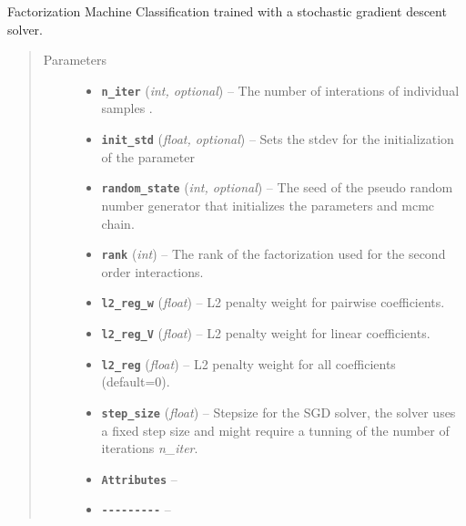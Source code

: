 \documentclass[letterpaper,10pt,english]{sphinxmanual}
\begin{document}
\begin{fulllineitems}
\label{api:fastFM.sgd.FMClassification}
Factorization Machine Classification trained with a stochastic gradient
descent solver.
\begin{quote}\begin{description}
\item[{Parameters}] \leavevmode\begin{itemize}
\item {} 
\textbf{\texttt{n\_iter}} (\emph{int, optional}) -- The number of interations of individual samples .

\item {} 
\textbf{\texttt{init\_std}} (\emph{float, optional}) -- Sets the stdev for the initialization of the parameter

\item {} 
\textbf{\texttt{random\_state}} (\emph{int, optional}) -- The seed of the pseudo random number generator that
initializes the parameters and mcmc chain.

\item {} 
\textbf{\texttt{rank}} (\emph{int}) -- The rank of the factorization used for the second order interactions.

\item {} 
\textbf{\texttt{l2\_reg\_w}} (\emph{float}) -- L2 penalty weight for pairwise coefficients.

\item {} 
\textbf{\texttt{l2\_reg\_V}} (\emph{float}) -- L2 penalty weight for linear coefficients.

\item {} 
\textbf{\texttt{l2\_reg}} (\emph{float}) -- L2 penalty weight for all coefficients (default=0).

\item {} 
\textbf{\texttt{step\_size}} (\emph{float}) -- Stepsize for the SGD solver, the solver uses a fixed step size and
might require a tunning of the number of iterations \emph{n\_iter}.

\item {} 
\textbf{\texttt{Attributes}} -- 

\item {} 
\textbf{\texttt{-{-}-{-}-{-}-{-}-}} -- 


\end{itemize}
\end{description}
\end{quote}
\end{fulllineitems}
\end{document}
